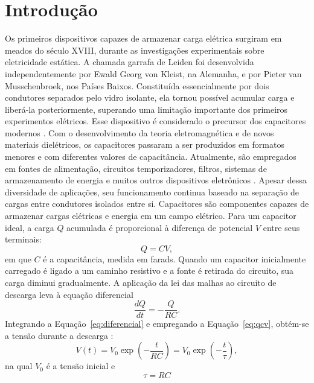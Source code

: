\documentclass[a4paper,12pt]{article}
\begin{document}
\section{Introdução}
Os primeiros dispositivos capazes de armazenar carga elétrica surgiram em
meados do século XVIII, durante as investigações experimentais sobre eletricidade
estática. A chamada garrafa de Leiden foi desenvolvida independentemente por
Ewald Georg von Kleist, na Alemanha, e por Pieter van Musschenbroek, nos Países
Baixos. Constituída essencialmente por dois condutores separados pelo vidro
isolante, ela tornou possível acumular carga e liberá-la posteriormente, superando
uma limitação importante dos primeiros experimentos elétricos. Esse dispositivo é
considerado o precursor dos capacitores modernos
\parencite{heilbron2022,smithsonian_leyden}.
Com o desenvolvimento da teoria eletromagnética e de novos materiais dielétricos,
os capacitores passaram a ser produzidos em formatos menores e com diferentes
valores de capacitância. Atualmente, são empregados em fontes de alimentação,
circuitos temporizadores, filtros, sistemas de armazenamento de energia e muitos
outros dispositivos eletrônicos \parencite{ling2016}. Apesar dessa diversidade
de aplicações, seu
funcionamento continua baseado na separação de cargas entre condutores isolados
entre si.
Capacitores são componentes capazes de armazenar cargas elétricas e energia em
um campo elétrico. Para um capacitor ideal, a carga $Q$ acumulada é proporcional
à diferença de potencial $V$ entre seus terminais:
\begin{equation}
  Q=CV,
  \label{eq:qcv}
\end{equation}
em que $C$ é a capacitância, medida em farads. Quando um capacitor inicialmente
carregado é ligado a um caminho resistivo e a fonte é retirada do circuito, sua
carga diminui gradualmente. A aplicação da lei das malhas ao circuito de descarga
leva à equação diferencial
\begin{equation}
  \frac{dQ}{dt}=-\frac{Q}{RC}.
  \label{eq:diferencial}
\end{equation}
Integrando a Equação~\eqref{eq:diferencial} e empregando a
Equação~\eqref{eq:qcv}, obtém-se a tensão durante a descarga
\parencite{halliday,ling2016,mit_rc2007,roteiro}:
\begin{equation}
  V(t)=V_0\exp\left(-\frac{t}{RC}\right)
      =V_0\exp\left(-\frac{t}{\tau}\right),
  \label{eq:descarga}
\end{equation}
na qual $V_0$ é a tensão inicial e
\begin{equation}
  \tau=RC
  \label{eq:tau}
\end{equation}
\end{document}
